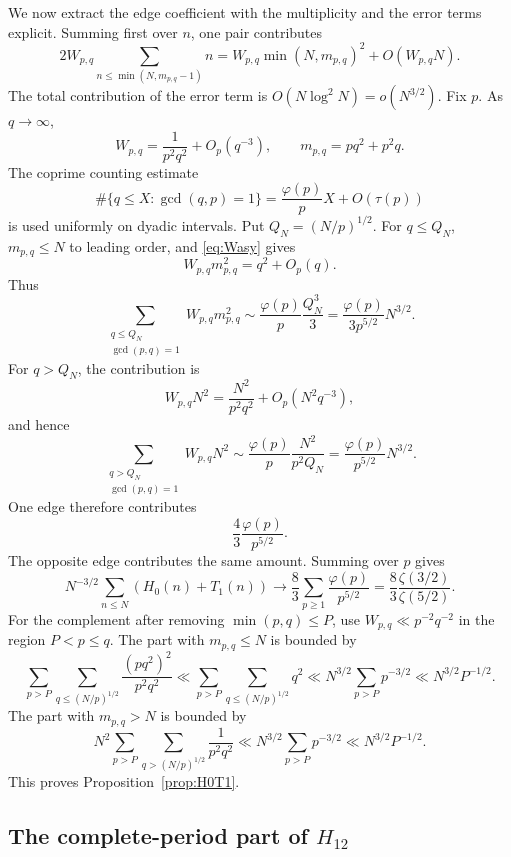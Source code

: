 \documentclass[a4paper,american,11pt]{amsart}
\theoremstyle{plain}
\theoremstyle{definition}
\begin{document}
We now extract the edge coefficient with the multiplicity and the error terms
explicit.  Summing first over \(n\), one pair contributes
\[
 2W_{p,q}\sum_{n\le \min(N,m_{p,q}-1)} n
 =W_{p,q}\min(N,m_{p,q})^2+O(W_{p,q}N).
\]
The total contribution of the error term is \(O(N\log^2N)=o(N^{3/2})\).
Fix \(p\).  As \(q\to\infty\),
\begin{equation}\label{eq:Wasy}
 W_{p,q}=\frac{1}{p^2q^2}+O_p(q^{-3}),
 \qquad
 m_{p,q}=pq^2+p^2q.
\end{equation}
The coprime counting estimate
\begin{equation}\label{eq:coprimeDensity}
 \#\{q\le X:\gcd(q,p)=1\}=\frac{\varphi(p)}{p}X+O(\tau(p))
\end{equation}
is used uniformly on dyadic intervals.  Put \(Q_N=(N/p)^{1/2}\).  For
\(q\le Q_N\), \(m_{p,q}\le N\) to leading order, and \eqref{eq:Wasy} gives
\[
 W_{p,q}m_{p,q}^2=q^2+O_p(q).
\]
Thus
\[
 \sum_{\substack{q\le Q_N\\\gcd(p,q)=1}} W_{p,q}m_{p,q}^2
 \sim
 \frac{\varphi(p)}{p}\frac{Q_N^3}{3}
 =\frac{\varphi(p)}{3p^{5/2}}N^{3/2}.
\]
For \(q>Q_N\), the contribution is
\[
 W_{p,q}N^2=\frac{N^2}{p^2q^2}+O_p(N^2q^{-3}),
\]
and hence
\[
 \sum_{\substack{q>Q_N\\\gcd(p,q)=1}}W_{p,q}N^2
 \sim
 \frac{\varphi(p)}{p}\frac{N^2}{p^2Q_N}
 =\frac{\varphi(p)}{p^{5/2}}N^{3/2}.
\]
One edge therefore contributes
\[
 \frac43\frac{\varphi(p)}{p^{5/2}}.
\]
The opposite edge contributes the same amount.  Summing over \(p\) gives
\[
 N^{-3/2}\sum_{n\le N}(H_0(n)+T_1(n))
 \longrightarrow
 \frac83\sum_{p\ge1}\frac{\varphi(p)}{p^{5/2}}
 =\frac83\frac{\zeta(3/2)}{\zeta(5/2)}.
\]
For the complement after removing \(\min(p,q)\le P\), use
\(W_{p,q}\ll p^{-2}q^{-2}\) in the region \(P<p\le q\).  The part with
\(m_{p,q}\le N\) is bounded by
\[
 \sum_{p>P}\sum_{q\le (N/p)^{1/2}}\frac{(pq^2)^2}{p^2q^2}
 \ll
 \sum_{p>P}\sum_{q\le (N/p)^{1/2}}q^2
 \ll
 N^{3/2}\sum_{p>P}p^{-3/2}
 \ll
 N^{3/2}P^{-1/2}.
\]
The part with \(m_{p,q}>N\) is bounded by
\[
 N^2\sum_{p>P}\sum_{q>(N/p)^{1/2}}\frac{1}{p^2q^2}
 \ll
 N^{3/2}\sum_{p>P}p^{-3/2}
 \ll
 N^{3/2}P^{-1/2}.
\]
This proves Proposition~\ref{prop:H0T1}.

\subsection{The complete-period part of \(H_{12}\)}
\end{document}
